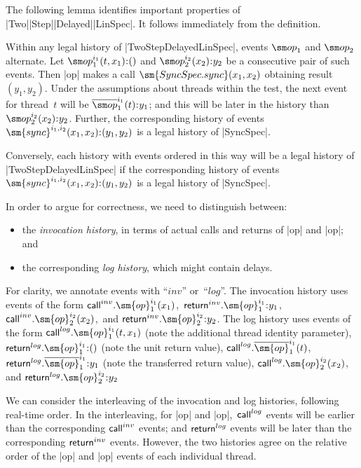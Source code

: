 The following lemma identifies important properties of
|Two|\-|Step|\-|Delayed|\-|LinSpec|.  It follows immediately from the
definition.
%
\begin{lemma}
\label{lem:TwoStepDelayedLinSpec}
Within any legal history of |TwoStepDelayedLinSpec|, events $\op_1$ and
$\op_2$ alternate.  Let $\op_1^{i_1}(t,x_1) \:: ()$ and $\op_2^{i_2}(x_2) \::
y_2$ be a consecutive pair of such events.  Then |op| makes a call
$\sm{SyncSpec.sync}(x_1, x_2)$ obtaining result $(y_1,y_2)$.  Under the
assumptions about threads within the test, the next event for thread~$t$ will
be $\overline\op_1^{i_1}(t) \:: y_1$; and this will be later in the history
than $\op_2^{i_2}(x_2) \:: y_2$.  Further, the corresponding history of
events $\sm{sync}^{i_1,i_2}(x_1,x_2) \:: (y_1,y_2)$ is a legal history of
|SyncSpec|.

Conversely, each history with events ordered in this way will be a legal
history of |TwoStepDelayedLinSpec| if  the corresponding history
of events $\sm{sync}^{i_1,i_2}(x_1,x_2) \:: (y_1,y_2)$ is a legal history of
|SyncSpec|.
\end{lemma}


In order to argue for correctness, we need to distinguish between:
%
\begin{itemize}
\item the \emph{invocation history}, in terms of actual calls and returns of
  |op| and |op|; and

\item the corresponding \emph{log history}, which might contain delays.
\end{itemize}
%
For clarity, we annotate events with ``$inv$'' or~``$log$''.  The invocation
history uses events of the form $\call^{inv}.\sm{op}_1^{i_1}(x_1)$,\,
$\return^{inv}.\sm{op}_1^{i_1} \:: y_1$,\,
$\call^{inv}.\sm{op}_2^{i_2}(x_2)$,\, and $\return^{inv}.\sm{op}_2^{i_2} \::
y_2$.  The log history uses events of the form
$\call^{log}.\sm{op}_1^{i_1}(t,x_1)$ (note the additional thread identity
parameter), $\return^{log}.\sm{op}_1^{i_1} \:: ()$ (note the unit return
value), $\call^{log}.\overline{\sm{op}}_1^{i_1}(t)$,\,
$\return^{log}.\overline{\sm{op}}_1^{i_1} \:: y_1$ (note the transferred
return value), $\call^{log}.\sm{op}_2^{i_2}(x_2)$, and
$\return^{log}.\sm{op}_2^{i_2} \:: y_2$

We can consider the interleaving of the invocation and log histories,
following real-time order.  In the interleaving, for |op| and |op|,\,
$\mathsf{call}^{log}$ events will be earlier than the corresponding $\mathsf{call}^{inv}$
events; and $\mathsf{return}^{log}$ events will be later than the corresponding
$\mathsf{return}^{inv}$ events.  However, the two histories agree on the relative
order of the |op| and |op| events of each individual thread.


